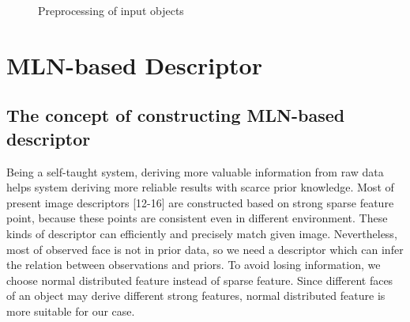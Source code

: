 \documentclass{tADR2e}
\begin{document}
\begin{figure}
\begin{center}
\hspace{2cm}
\caption{Preprocessing of input objects}
\end{center}
\end{figure}



\section{MLN-based Descriptor}
\subsection{The concept of constructing MLN-based descriptor}

Being a self-taught system, deriving more valuable information from raw data helps system deriving more reliable results with scarce prior knowledge. Most of present image descriptors [12-16] are constructed based on strong sparse feature point, because these points are consistent even in different environment. These kinds of descriptor can efficiently and precisely match given image. Nevertheless, most of observed face is not in prior data, so we need a descriptor which can infer the relation between observations and priors. To avoid losing information, we choose normal distributed feature instead of sparse feature. Since different faces of an object may derive different strong features, normal distributed feature is more suitable for our case. 
\end{document}
